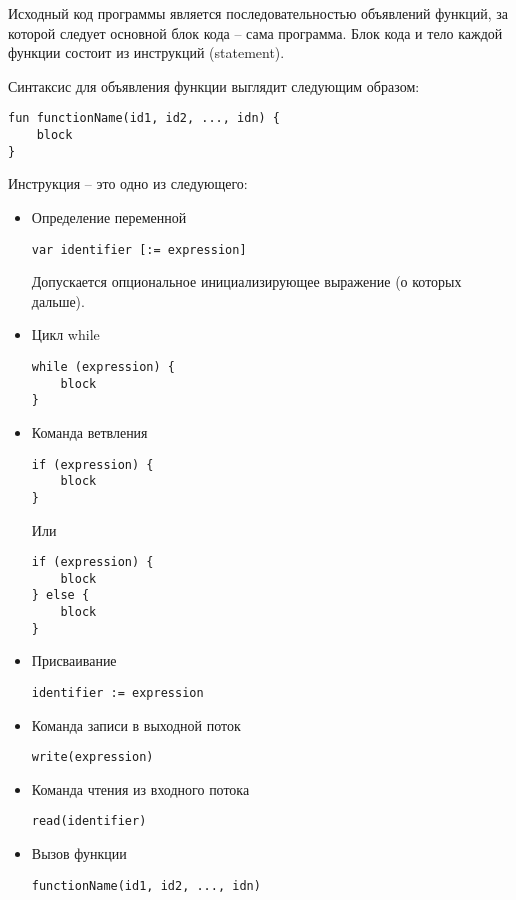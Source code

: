 Исходный код программы является последовательностью объявлений функций, за
которой следует основной блок кода -- сама программа.
Блок кода и тело каждой функции состоит из инструкций (statement).

Синтаксис для объявления функции выглядит следующим образом:
\begin{lstlisting}
fun functionName(id1, id2, ..., idn) {
    block
}
\end{lstlisting}

Инструкция -- это одно из следующего:
\begin{itemize}
    \item Определение переменной
\begin{lstlisting}
var identifier [:= expression]
\end{lstlisting}
    Допускается опциональное инициализирующее выражение (о которых дальше).\\
    
    \item Цикл while
\begin{lstlisting}
while (expression) {
    block
}
\end{lstlisting}
    
    \item Команда ветвления
\begin{lstlisting}
if (expression) {
    block
}
\end{lstlisting}
    Или
\begin{lstlisting}
if (expression) {
    block
} else {
    block
}
\end{lstlisting}
    
    \item Присваивание
\begin{lstlisting}
identifier := expression
\end{lstlisting}
    
    \item Команда записи в выходной поток
\begin{lstlisting}
write(expression)
\end{lstlisting}

    \item Команда чтения из входного потока
\begin{lstlisting}
read(identifier)
\end{lstlisting}

    \item Вызов функции
\begin{lstlisting}
functionName(id1, id2, ..., idn)
\end{lstlisting}
\end{itemize}


